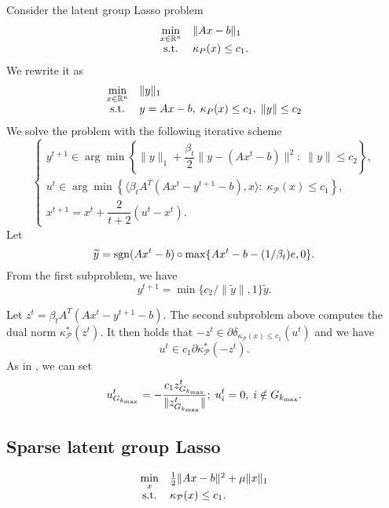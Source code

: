 \documentclass{article}
\numberwithin{equation}{section}
\begin{document}
Consider the latent group Lasso problem
\begin{equation}
	\begin{array}{cl}
	\min\limits_{x\in \mathbb{R}^n} & \|Ax-b\|_1\\
	{\rm s.t.} & \kappa_P(x)\le c_1.
	\end{array}
\end{equation}
We rewrite it as 
\begin{equation}
\begin{array}{cl}
\min\limits_{x\in \mathbb{R}^n} & \|y\|_1\\
{\rm s.t.} & y = Ax-b, \; \kappa_P(x)\le c_1, \; \|y\|\le c_2
\end{array}
\end{equation}
We solve the problem with the following iterative scheme
\begin{equation}
	\left\{
	\begin{array}{l}
	y^{t+1} \in \arg\min \left\{\|y\|_1 +\dfrac{\beta_t}{2}\|y-(Ax^t-b)\|^2:\; \|y\|\le c_2 \right\},\\
	u^t \in \arg\min \left\{\langle\beta_tA^T(Ax^t-y^{t+1}-b), x\rangle :\;\kappa_{\mathcal{P}}(x)\le c_1 \right\},\\
	x^{t+1} = x^t+\dfrac{2}{t+2}(u^t-x^t).
	\end{array}
	\right.
\end{equation}
Let 
\[
\widetilde{y} = {\rm sgn}(Ax^t-b)\circ\max\{Ax^t-b - (1/{\beta_t})e, 0\}.
\]
From the first subproblem, we have
\[
y^{t+1} = \min\{c_2/\|\widetilde y\|, 1\}\widetilde{y}.
\]

Let $ z^t = \beta_tA^T(Ax^t-y^{t+1}-b) $. The second subproblem above computes the dual norm $ \kappa^*_{\mathcal{P}}(z^t) $. It then holds that $ -z^t\in \partial \delta_{\kappa_{\mathcal{P}}(x)\le c_1}(u^t)  $ and we have
\[
u^t\in c_1\partial \kappa^*_{\mathcal{P}}(-z^t).
\] 
As in \cite[Section~3.1]{rao2013conditional}, we can set
\[
u^t_{G_{k_{\rm max}}}=-\dfrac{c_1z^t_{G_{k_{\rm max}}}}{\|z^t_{G_{k_{\rm max}}}\|}; \; u^t_i = 0, \; i\notin G_{k_{\rm max}}.
\]

\subsection{Sparse latent group Lasso}
\begin{equation}
	\begin{array}{cl}
	\min\limits_{x} & \frac12\|Ax-b\|^2 +\mu \|x\|_1\\
	{\rm s.t.} & \kappa_{\mathcal{P}}(x)\leq c_1.
	\end{array}
\end{equation}
\end{document}
